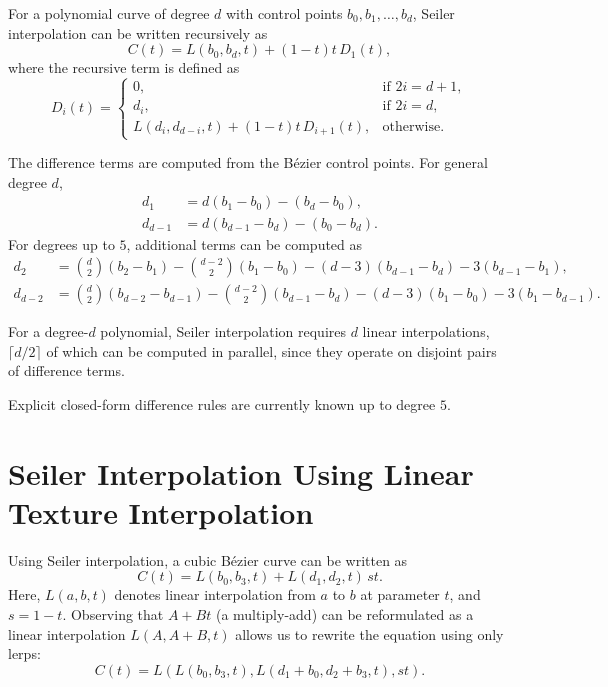 \documentclass{jcgt}
\begin{document}
For a polynomial curve of degree $d$ with control points 
$b_0, b_1, \dots, b_d$, Seiler interpolation can be written recursively as
\[
C(t) = L(b_0, b_d, t) + (1 - t)t \, D_1(t),
\]
where the recursive term is defined as
\[
D_i(t) =
\begin{cases}
0, & \text{if } 2i = d + 1, \\[2pt]
d_i, & \text{if } 2i = d, \\[2pt]
L(d_i, d_{d-i}, t) + (1 - t)t \, D_{i+1}(t), & \text{otherwise}.
\end{cases}
\]

The difference terms are computed from the Bézier control points. 
For general degree $d$,
\begin{align*}
d_1 &= d(b_1 - b_0) - (b_d - b_0),\\
d_{d-1} &= d(b_{d-1} - b_d) - (b_0 - b_d).
\end{align*}
For degrees up to $5$, additional terms can be computed as
\begin{align*}
d_2 &=
\!\binom{d}{2}\!(b_2 - b_1)
- \binom{d-2}{2}\!(b_1 - b_0)
- (d-3)(b_{d-1} - b_d)
- 3(b_{d-1} - b_1),
\\[3pt]
d_{d-2} &=
\!\binom{d}{2}\!(b_{d-2} - b_{d-1})\!
- \!\binom{d-2}{2}\!(b_{d-1} - b_d)\!
-\! (d-3)(b_1 - b_0)
\!-\! 3(b_1 - b_{d-1}).
\end{align*}

For a degree-$d$ polynomial, Seiler interpolation requires $d$ linear 
interpolations, $\lceil d/2 \rceil$ of which can be computed in parallel, 
since they operate on disjoint pairs of difference terms.

Explicit closed-form difference rules are currently known up to degree $5$.

\section{Seiler Interpolation Using Linear Texture Interpolation}

Using Seiler interpolation, a cubic Bézier curve can be written as 
\begin{equation}
C(t) = L(b_0, b_3, t) + L(d_1, d_2, t)\,st .
\end{equation}
Here, $L(a,b,t)$ denotes linear interpolation from $a$ to $b$ at parameter $t$, and $s = 1-t$. Observing that $A+Bt$ (a multiply-add) can be reformulated as a linear interpolation $L(A, A+B, t)$ allows us to rewrite the equation using only lerps:
\begin{equation}
C(t) = L( L(b_0, b_3, t), L(d_1 + b_0, d_2 + b_3, t), st).
\end{equation}
\end{document}
